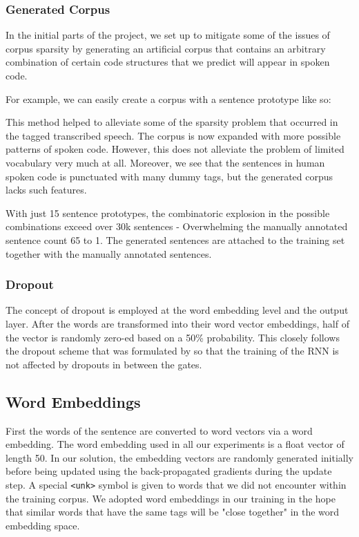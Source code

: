 \documentclass[fyp]{socreport}
\begin{document}

\subsubsection{Generated Corpus}
In the initial parts of the project, we set up to mitigate some of the issues
of corpus sparsity by generating an artificial corpus that contains an arbitrary
combination of certain code structures that we predict will appear in spoken code.

For example, we can easily create a corpus with a sentence prototype like so:

\hspace{20pt}
   

This method helped to alleviate some of the sparsity problem that occurred in
the tagged transcribed speech. The corpus is now expanded with more possible
patterns of spoken code. However, this does not alleviate the problem of limited
vocabulary very much at all. Moreover, we see that the sentences in human spoken
code is punctuated with many dummy tags, but the generated corpus lacks such
features.

With just 15 sentence prototypes, the combinatoric explosion in the possible
combinations exceed over 30k sentences - Overwhelming the manually annotated
sentence count 65 to 1. The generated sentences are attached to the training
set together with the manually annotated sentences.

\subsubsection{Dropout} The concept of dropout is employed at the word
embedding level and the output layer. After the words are transformed into
their word vector embeddings, half of the vector is randomly zero-ed based on a
50\% probability. This closely follows the dropout scheme that was formulated
by \cite{2014Zaremba} so that the training of the RNN is not affected by
dropouts in between the gates.

\subsection{Word Embeddings}
First the words of the sentence are converted to word vectors via a word
embedding. The word embedding used in all our experiments is a float vector of
length 50. In our solution, the embedding vectors are randomly generated
initially before being updated using the back-propagated gradients during the
update step. A special \texttt{<unk>} symbol is given to words that we did not
encounter within the training corpus. We adopted word embeddings in our
training in the hope that similar words that have the same tags will be "close
together" in the word embedding space.
\end{document}
